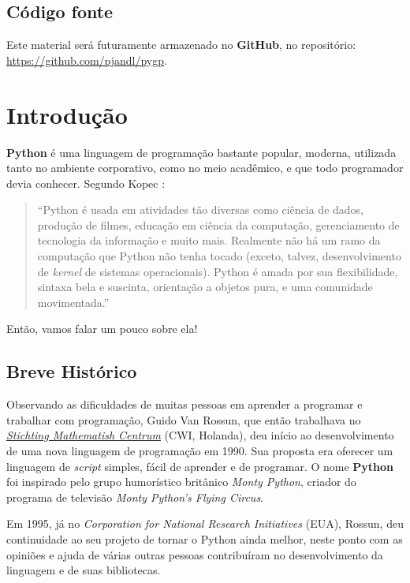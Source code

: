 \documentclass[
]{book}
\begin{document}
\hypertarget{cuxf3digo-fonte}{%
\section*{Código fonte}\label{cuxf3digo-fonte}}

Este material será futuramente armazenado no \textbf{GitHub}, no repositório: \url{https://github.com/pjandl/pygp}.

\hypertarget{intro}{%
\chapter{Introdução}\label{intro}}

\textbf{Python} é uma linguagem de programação bastante popular, moderna, utilizada tanto no ambiente corporativo, como no meio acadêmico, e que todo programador devia conhecer. Segundo Kopec \citep[pág.1]{kop2019}:

\begin{quote}
``Python é usada em atividades tão diversas como ciência de dados, produção de filmes, educação em ciência da computação, gerenciamento de tecnologia da informação e muito mais. Realmente não há um ramo da computação que Python não tenha tocado (exceto, talvez, desenvolvimento de \emph{kernel} de sistemas operacionais). Python é amada por sua flexibilidade, sintaxa bela e suscinta, orientação a objetos pura, e uma comunidade movimentada.''
\end{quote}

Então, vamos falar um pouco sobre ela!

\hypertarget{introd-histo}{%
\section{Breve Histórico}\label{introd-histo}}

Observando as dificuldades de muitas pessoas em aprender a programar e trabalhar com programação, Guido Van Rossun, que então trabalhava no \href{http://www.cwi.nl/}{\emph{Stichting Mathematish Centrum}} (CWI, Holanda), deu início ao desenvolvimento de uma nova linguagem de programação em 1990. Sua proposta era oferecer um linguagem de \emph{script} simples, fácil de aprender e de programar. O nome \textbf{Python} foi inspirado pelo grupo humorístico britânico \emph{Monty Python}, criador do programa de televisão \emph{Monty Python's Flying Circus}.

Em 1995, já no \emph{Corporation for National Research Initiatives} (EUA), Rossun, deu continuidade ao seu projeto de tornar o Python ainda melhor, neste ponto com as opiniões e ajuda de várias outras pessoas contribuíram no desenvolvimento da linguagem e de suas bibliotecas.
\end{document}
